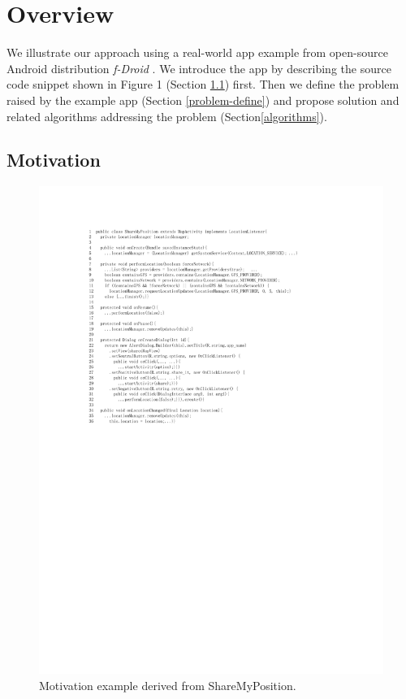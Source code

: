 \section{Overview}\label{overview}
We illustrate our approach using a real-world app example from open-source Android distribution \textit{f-Droid}\cite{newFDroid} . We introduce the app by describing the source code snippet shown in Figure 1 (Section \ref{motivation}) first. Then we define the problem raised by the example app (Section \ref{problem-define}) and propose solution and related algorithms addressing the problem (Section\ref{algorithms}). 
\subsection{Motivation} \label{motivation}

\begin{figure}[htbp]  
  \centering  
  \includegraphics[width=1\linewidth]{pic/motivation1.pdf}  
  \caption{Motivation example derived from ShareMyPosition\cite{newShareMyPosition}.}  
  \label{fig:1}  
\end{figure}


